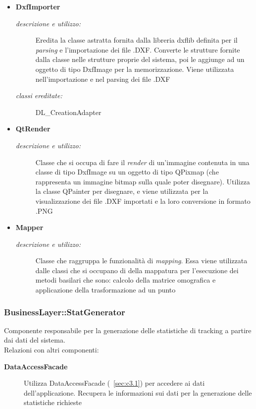 \begin{itemize}
\begin{description}
\end{description}
\item \textbf{DxfImporter}
\begin{description}
\item [\textit{descrizione e utilizzo:}] Eredita la classe astratta fornita dalla libreria dxflib definita per il \textit{parsing} e l'importazione dei file .DXF. Converte le strutture fornite dalla classe nelle strutture proprie del sistema, poi le aggiunge ad un oggetto di tipo DxfImage per la memorizzazione. Viene utilizzata nell'importazione e nel parsing dei file .DXF
\item [\textit{classi ereditate:}] DL\_CreationAdapter
\end{description}
\item \textbf{QtRender}
\begin{description}
\item [\textit{descrizione e utilizzo:}] Classe che si occupa di fare il \textit{render} di un'immagine contenuta in una classe di tipo DxfImage su un oggetto di tipo QPixmap (che rappresenta un immagine bitmap sulla quale poter disegnare). Utilizza la classe QPainter per disegnare, e viene utilizzata per la visualizzazione dei file .DXF importati e la loro conversione in formato .PNG
\end{description}
\item \textbf{Mapper}
\begin{description}
\item [\textit{descrizione e utilizzo:}] Classe che raggruppa le funzionalità di \textit{mapping}. Essa viene utilizzata dalle classi che si occupano di della mappatura per l'esecuzione dei metodi basilari che  sono: calcolo della matrice omografica e applicazione della trasformazione ad un punto
\end{description}
\end{itemize}

\subsubsection{BusinessLayer::StatGenerator} \label{sec:c2.3}
Componente responsabile per la generazione delle statistiche di tracking a partire dai dati del sistema. \\
Relazioni con altri componenti: 
\begin{description} 
\item [\textbf{DataAccessFacade}]
Utilizza DataAccessFacade (~\ref{sec:c3.1}) per accedere ai dati dell'applicazione. Recupera le informazioni sui dati per la generazione delle statistiche richieste 
\end{description} 

